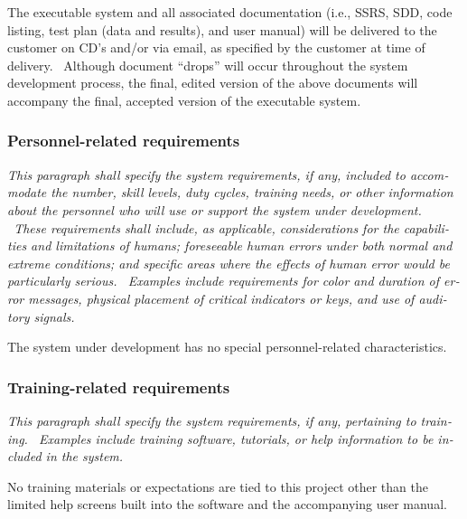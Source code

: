 \documentclass[twoside,letterpaper]{article}
\begin{document}
{\color{black}
The executable system and all associated documentation (i.e., SSRS, SDD,
code listing, test plan (data and results), and user manual) will be
delivered to the customer on CD{\textquoteright}s and/or via email, as
specified by the customer at time of delivery. \ Although document
{\textquotedblleft}drops{\textquotedblright} will occur throughout the
system development process, the final, edited version of the above
documents will accompany the final, accepted version of the executable
system.}

\subsubsection[Personnel{}-related
requirements]{\rmfamily\bfseries\color{black}
Personnel-related requirements}
{\color{black}
\foreignlanguage{english}{\textit{This paragraph shall specify the
system requirements, if any, included to accommodate the number, skill
levels, duty cycles, training needs, or other information about the
personnel who will use or support the system under development. \ These
requirements shall include, as applicable, considerations for the
capabilities and limitations of humans; foreseeable human errors under
both normal and extreme conditions; and specific areas where the
effects of human error would be particularly serious. \ Examples
include requirements for color and duration of error messages, physical
placement of critical indicators or keys, and use of auditory
signals.}}\foreignlanguage{english}{ }}

{\color{black}
The system under development has no special personnel-related
characteristics. }

\subsubsection[Training{}-related
requirements]{\rmfamily\bfseries\color{black}
Training-related requirements}
{\color{black}
\foreignlanguage{english}{\textit{This paragraph shall specify the
system requirements, if any, pertaining to training. \ Examples include
training software, tutorials, or help information to be included in the
system.}}\foreignlanguage{english}{ \ \ }}

{\color{black}
No training materials or expectations are tied to this project other
than the limited help screens built into the software and the
accompanying user manual.}
\end{document}

